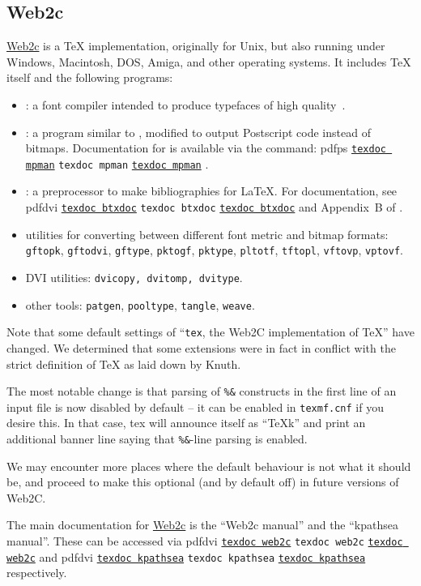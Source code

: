 \documentclass[11pt,a4paper]{article}
\newcommand{\psext}{ps}
\newcommand{\pdfext}{pdf}
\newcommand{\dviext}{dvi}
\let\docext=\pdfext
\let\docext=\dviext
\newcommand{\dlink}[3]{%
  \ifpdf
    \ifx\pdfext#3
      \href{#1/#2.#3}{\texttt{texdoc #2}}%
    \else
      \texttt{texdoc #2}%
    \fi
  \else
     \href{#1/#2.#3}{\mbox{\texttt{texdoc #2}}}%
  \fi}
\begin{document}
\subsection{Web2c}
\href{http://tug.org/web2c/}{Web2c} is a \TeX{} implementation,
originally for Unix, but also running under Windows, Macintosh,
DOS, Amiga, and other operating systems. It includes \TeX{} itself and
the following programs:
  \begin{itemize}
  \item \MF: a font compiler intended to produce typefaces of high
    quality~\cite{Knuth:1984:M}.
  \item \MP: a program similar to \MF, modified to output Postscript
    code instead of bitmaps. Documentation for \MP{} is available
    via the command: \dlink{../metapost/base}{mpman}{\psext}.
  \item \BibTeX: a preprocessor to make bibliographies for
    \LaTeX. For documentation, see \dlink{../bibtex/base}{btxdoc}{\dviext} and
    Appendix~B of \cite{Lamport:1994:LDP}.
  \item utilities for converting between different font metric and
    bitmap formats: \texttt{gftopk}, \texttt{gftodvi},
    \texttt{gftype}, \texttt{pktogf}, \texttt{pktype},
    \texttt{pltotf}, \texttt{tftopl}, \texttt{vftovp}, \texttt{vptovf}.
  \item DVI utilities: \texttt{dvicopy, dvitomp, dvitype}.
  \item other tools: \texttt{patgen}, \texttt{pooltype},
    \texttt{tangle}, \texttt{weave}.
  \end{itemize}
  
  Note that some default settings of ``\texttt{tex}, the Web2C
  implementation of \TeX'' have changed.  We determined that some
  extensions were in fact in conflict with the strict definition of
  TeX as laid down by Knuth.

  The most notable change is that parsing of \verb+%&+ constructs in the
  first line of an input file is now disabled by default -- it can be
  enabled in \texttt{texmf.cnf} if you desire this.  In that case, tex will
  announce itself as ``TeXk'' and print an additional banner line saying
  that \verb+%&+-line parsing is enabled.
  
  We may encounter more places where the default behaviour is not what
  it should be, and proceed to make this optional (and by default off)
  in future versions of Web2C.

  The main documentation for \href{http://tug.org/web2c/}{Web2c} is
  the ``Web2c manual'' and the ``kpathsea manual''. These can be
  accessed via \dlink{../programs}{web2c}{\docext} and
  \dlink{../programs}{kpathsea}{\docext} respectively.
\end{document}
